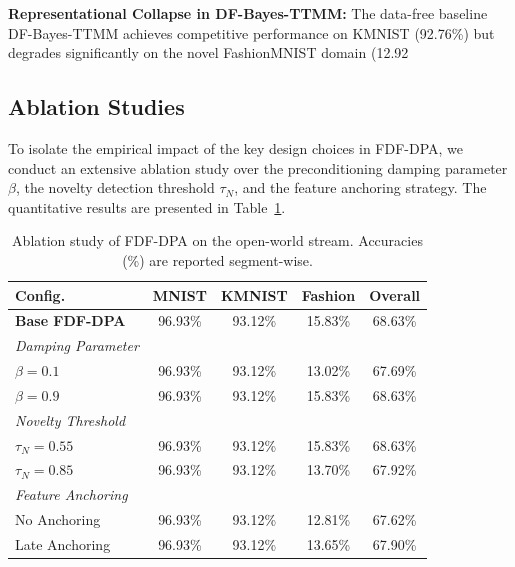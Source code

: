 \documentclass{article}
\theoremstyle{plain}
\theoremstyle{definition}
\theoremstyle{remark}
\begin{document}
\textbf{Representational Collapse in DF-Bayes-TTMM:} The data-free baseline DF-Bayes-TTMM achieves competitive performance on KMNIST (92.76\%) but degrades significantly on the novel FashionMNIST domain (12.92%

\subsection{Ablation Studies}
\label{subsec:ablations}
To isolate the empirical impact of the key design choices in FDF-DPA, we conduct an extensive ablation study over the preconditioning damping parameter $\beta$, the novelty detection threshold $\tau_N$, and the feature anchoring strategy. The quantitative results are presented in Table~\ref{tab:ablations}.

\begin{table}[h]
\centering
\caption{Ablation study of FDF-DPA on the open-world stream. Accuracies (\%) are reported segment-wise.}
\label{tab:ablations}
\vskip 0.15in
\setlength{\tabcolsep}{2pt}
\small
\begin{tabular}{lcccc}
\toprule
\textbf{Config.} & \textbf{MNIST} & \textbf{KMNIST} & \textbf{Fashion} & \textbf{Overall} \\
\midrule
\textbf{Base FDF-DPA} & 96.93\% & 93.12\% & 15.83\% & 68.63\% \\
\midrule
\textit{Damping Parameter} & & & & \\
$\beta = 0.1$ & 96.93\% & 93.12\% & 13.02\% & 67.69\% \\
$\beta = 0.9$ & 96.93\% & 93.12\% & 15.83\% & 68.63\% \\
\midrule
\textit{Novelty Threshold} & & & & \\
$\tau_N = 0.55$ & 96.93\% & 93.12\% & 15.83\% & 68.63\% \\
$\tau_N = 0.85$ & 96.93\% & 93.12\% & 13.70\% & 67.92\% \\
\midrule
\textit{Feature Anchoring} & & & & \\
No Anchoring & 96.93\% & 93.12\% & 12.81\% & 67.62\% \\
Late Anchoring & 96.93\% & 93.12\% & 13.65\% & 67.90\% \\
\bottomrule
\end{tabular}
\end{table}
\end{document}
